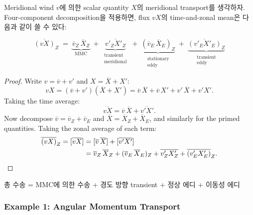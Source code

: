 Meridional wind $v$에 의한 scalar quantity $X$의 meridional transport를 생각하자.
Four-component decomposition을 적용하면, flux $vX$의 time-and-zonal mean은
다음과 같이 쓸 수 있다:

\begin{proposition}\label{prop:flux-decomp}

  \begin{equation}\label{eq:flux-decomp}
    \overline{(vX)}_Z
    \;=\; \underbrace{\overline{v}_Z\,\overline{X}_Z}_{\text{MMC}}
    \;+\; \underbrace{\overline{v'_Z X'_Z}}_{\substack{\text{transient}\\\text{meridional}}}
    \;+\; \underbrace{(\overline{v}_E\,\overline{X}_E)_Z}_{\substack{\text{stationary}\\\text{eddy}}}
    \;+\; \underbrace{\overline{(v'_E X'_E)}_Z}_{\substack{\text{transient}\\\text{eddy}}}
  \end{equation}
\end{proposition}

\begin{proof}
  Write $v = \overline{v} + v'$ and $X = \overline{X} + X'$:
  \[
    vX = (\overline{v} + v')(\overline{X} + X')
    = \overline{v}\,\overline{X} + \overline{v}\,X' + v'\,\overline{X} + v'X'.
  \]
  Taking the time average:
  \[
    \overline{vX} = \overline{v}\,\overline{X} + \overline{v'X'}.
  \]
  Now decompose $\overline{v} = \overline{v}_Z + \overline{v}_E$ and
  $\overline{X} = \overline{X}_Z + \overline{X}_E$, and similarly for the primed
  quantities. Taking the zonal average of each term:
  \begin{align*}
    \overline{(vX)}_Z
    = [\overline{vX}]
    &= [\overline{v}\,\overline{X}] + [\overline{v'X'}] \\
    &= \overline{v}_Z\,\overline{X}_Z + (\overline{v}_E\,\overline{X}_E)_Z
       + \overline{v'_Z X'_Z} + \overline{(v'_E X'_E)}_Z. \qedhere
  \end{align*}
\end{proof}

\begin{hisublock}
  총 수송 = MMC에 의한 수송 + 경도 방향 transient + 정상 에디 + 이동성 에디
\end{hisublock}

\subsubsection{Example 1: Angular Momentum Transport}

